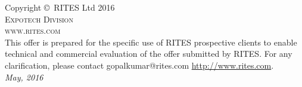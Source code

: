 \noindent Copyright \copyright\ RITES Ltd 2016\\ %

\noindent \textsc{Expotech Division}\\ %

\noindent \textsc{www.rites.com}\\ %

\noindent This offer is prepared for the specific use of RITES prospective clients to enable technical and commercial evaluation of the offer submitted by RITES.
For any clarification, please contact gopalkumar@rites.com  \url{http://www.rites.com}.\\ %

\noindent \textit{May, 2016} %

